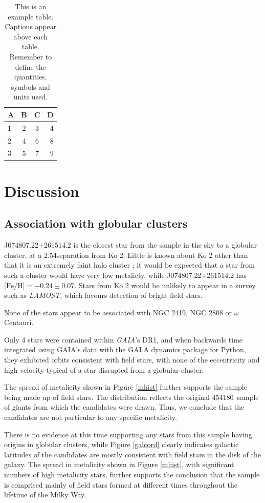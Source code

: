 \documentclass[a4paper,fleqn,usenatbib]{mnras}
\newcommand{\LamostGiants}{454180}
\newcommand{\project}[1]{\emph{#1}}
\newcommand{\lamost}{\project{LAMOST}}
\begin{document}
\begin{table}
	\centering
	\caption{This is an example table. Captions appear above each table.
	Remember to define the quantities, symbols and units used.}
	\label{tab:example_table}
	\begin{tabular}{lccr} %
		\hline
		A & B & C & D\\
		\hline
		1 & 2 & 3 & 4\\
		2 & 4 & 6 & 8\\
		3 & 5 & 7 & 9\\
		\hline
	\end{tabular}
\end{table}

\section{Discussion}
\subsection{Association with globular clusters}
J074807.22+261514.2 is the closest star from the sample in the sky to a globular cluster, at a 2.54\degree separation from Ko 2.
Little is known about Ko 2 other than that it is an extremely faint halo cluster \citep{koposov2007}; it would be expected that a star from such a cluster would have very low metalicty, while J074807.22+261514.2 has $ \text{[Fe/H]} = -0.24 \pm 0.07$. Stars from Ko 2 would be unlikely to appear in a survey such as \lamost, which favours detection of bright field stars.

None of the stars appear to be associated with NGC 2419, NGC 2808 or $\omega$ Centauri.

Only 4 stars were contained within \textit{GAIA}'s DR1, and when backwards time integrated using GAIA's data with the GALA dynamics package for Python, they exhibited orbits consistent with field stars, with none of the eccentricity and high velocity typical of a star disrupted from a globular cluster.

The spread of metalicity shown in Figure \ref{mhist} further supports the sample being made up of field stars. The distribution reflects the original \LamostGiants \ sample of giants from which the candidates were drawn. Thus, we conclude that the candidates are not particular to any specific metalicity.

There is no evidence at this time supporting any stars from this sample having origins in globular clusters, while Figure \ref{galcord} clearly indicates galactic latitudes of the candidates are mostly consistent with field stars in the disk of the galaxy. The spread in metalicity shown in Figure \ref{mhist}, with significant numbers of high metalicity stars, further supports the conclusion that the sample is comprised mainly of field stars formed at different times throughout the lifetime of the Milky Way.
\end{document}
